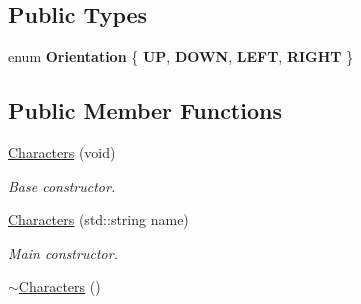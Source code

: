\subsection*{Public Types}
\begin{DoxyCompactItemize}
\item 
enum {\bfseries Orientation} \{ {\bfseries U\-P}, 
{\bfseries D\-O\-W\-N}, 
{\bfseries L\-E\-F\-T}, 
{\bfseries R\-I\-G\-H\-T}
 \}
\end{DoxyCompactItemize}
\subsection*{Public Member Functions}
\begin{DoxyCompactItemize}
\item 
\hyperlink{class_characters_a3b7d631de563c07caaa918e217a97436}{Characters} (void)
\begin{DoxyCompactList}\small\item\em Base constructor. \end{DoxyCompactList}\item 
\hyperlink{class_characters_a3ebbe5ca8cc3965b55283af002ce8707}{Characters} (std\-::string name)
\begin{DoxyCompactList}\small\item\em Main constructor. \end{DoxyCompactList}\item 
\hypertarget{class_characters_a4aea85daea3f08b8b933e82cd42b3109}{\hyperlink{class_characters_a4aea85daea3f08b8b933e82cd42b3109}{$\sim$\-Characters} ()}\label{class_characters_a4aea85daea3f08b8b933e82cd42b3109}


\end{DoxyCompactItemize}
